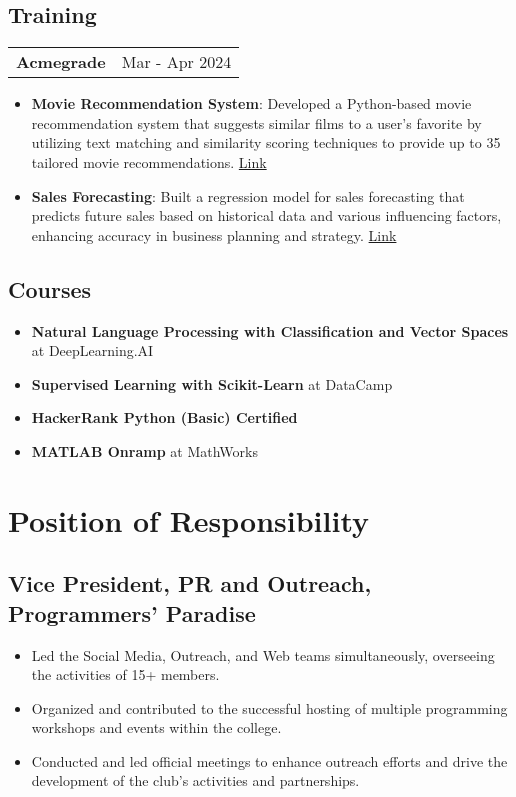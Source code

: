 \documentclass[a4paper,10pt]{article}
\begin{document}
\subsection*{Training}
\begin{tabular}{p{} p{}}
    \textbf{Acmegrade} & Mar - Apr 2024 \\
\end{tabular}
\begin{itemize}
    \item \textbf{Movie Recommendation System}: Developed a Python-based movie recommendation system that suggests similar films to a user’s favorite by utilizing text matching and similarity scoring techniques to provide up to 35 tailored movie recommendations. \href{https://github.com/anoushkaacc/Acmegrade-projects/tree/main/Movie%20Recommendation%20engine}{Link}
    \item \textbf{Sales Forecasting}: Built a regression model for sales forecasting that predicts future sales based on historical data and various influencing factors, enhancing accuracy in business planning and strategy. \href{https://github.com/anoushkaacc/Acmegrade-projects/tree/main/sales%20forecasting}{Link}
\end{itemize}

\subsection*{Courses}
\begin{itemize}
    \item \textbf{Natural Language Processing with Classification and Vector Spaces} at DeepLearning.AI
    \item \textbf{Supervised Learning with Scikit-Learn} at DataCamp
    \item \textbf{HackerRank Python (Basic) Certified}
    \item \textbf{MATLAB Onramp} at MathWorks
\end{itemize}

\section*{Position of Responsibility}
\subsection*{Vice President, PR and Outreach, Programmers' Paradise}
\begin{itemize}
    \item Led the Social Media, Outreach, and Web teams simultaneously, overseeing the activities of 15+ members. 
    \item Organized and contributed to the successful hosting of multiple programming workshops and events within the college.
    \item Conducted and led official meetings to enhance outreach efforts and drive the development of the club's activities and partnerships.
\end{itemize}
\end{document}
